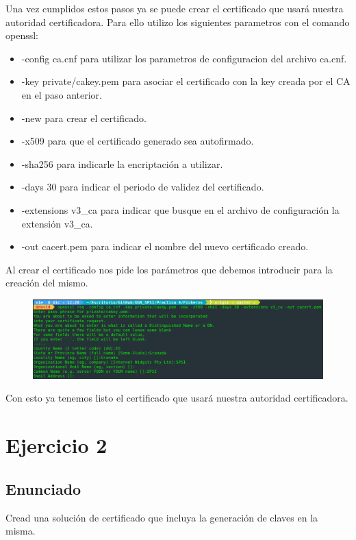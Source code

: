\documentclass[10pt,a4paper,spanish]{report}
\begin{document}
\noindent
Una vez cumplidos estos pasos ya se puede crear el certificado que usará nuestra autoridad certificadora. Para ello utilizo los siguientes parametros con el comando openssl:

\begin{itemize}
 \item -config ca.cnf para utilizar los parametros de configuracion del archivo ca.cnf.
 \item -key private/cakey.pem para asociar el certificado con la key creada por el CA en el paso anterior.
 \item -new para crear el certificado.
 \item -x509 para que el certificado generado sea autofirmado.
 \item -sha256 para indicarle la encriptación a utilizar.
 \item -days 30 para indicar el periodo de validez del certificado.
 \item -extensions v3\_ca para indicar que busque en el archivo de configuración la extensión v3\_ca.
 \item -out cacert.pem para indicar el nombre del nuevo certificado creado.
\end{itemize}

\noindent
Al crear el certificado nos pide los parámetros que debemos introducir para la creación del mismo.

\begin{figure}[!hbp]
 \centering  \includegraphics[width=1\textwidth]{./Imagenes/1_4.png}
\end{figure}

\noindent
Con esto ya tenemos listo el certificado que usará nuestra autoridad certificadora.

\chapter{Ejercicio 2}

\section{Enunciado}
\noindent
Cread una solución de certificado que incluya la generación de claves en la misma.
\end{document}
